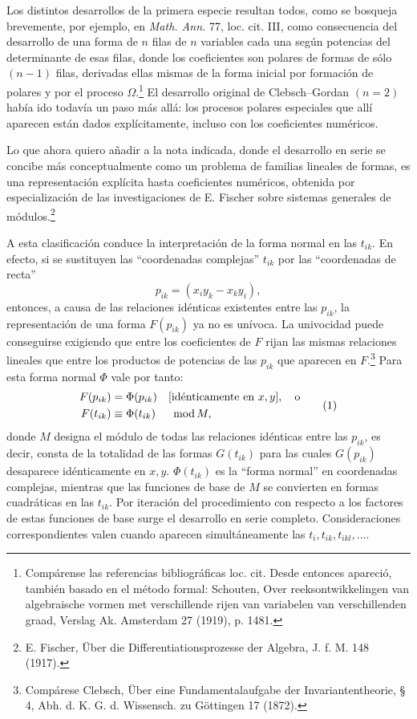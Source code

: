 \documentclass[11pt]{article}
\newcommand{\modu}[1]{\;\operatorname{mod} #1}
\begin{document}
Los distintos desarrollos de la primera especie resultan todos, como se bosqueja brevemente, por ejemplo, en \emph{Math. Ann.} 77, loc. cit. III, como consecuencia del desarrollo de una forma de \(n\) filas de \(n\) variables cada una según potencias del determinante de esas filas, donde los coeficientes son polares de formas de sólo \((n-1)\) filas, derivadas ellas mismas de la forma inicial por formación de polares y por el proceso \(\Omega\).\footnote{Compárense las referencias bibliográficas loc. cit. Desde entonces apareció, también basado en el método formal: Schouten, Over reeksontwikkelingen van algebraische vormen met verschillende rijen van variabelen van verschillenden graad, Verslag Ak. Amsterdam 27 (1919), p. 1481.} El desarrollo original de Clebsch--Gordan \((n=2)\) había ido todavía un paso más allá: los procesos polares especiales que allí aparecen están dados explícitamente, incluso con los coeficientes numéricos.

Lo que ahora quiero añadir a la nota indicada, donde el desarrollo en serie se concibe más conceptualmente como un problema de familias lineales de formas, es una representación explícita hasta coeficientes numéricos, obtenida por especialización de las investigaciones de E. Fischer sobre sistemas generales de módulos.\footnote{E. Fischer, Über die Differentiationsprozesse der Algebra, J. f. M. 148 (1917).}

A esta clasificación conduce la interpretación de la forma normal en las \(t_{ik}\). En efecto, si se sustituyen las ``coordenadas complejas'' \(t_{ik}\) por las ``coordenadas de recta''
\[
        p_{ik}=(x_i y_k-x_k y_i),
\]
entonces, a causa de las relaciones idénticas existentes entre las \(p_{ik}\), la representación de una forma \(F(p_{ik})\) ya no es unívoca. La univocidad puede conseguirse exigiendo que entre los coeficientes de \(F\) rijan las mismas relaciones lineales que entre los productos de potencias de las \(p_{ik}\) que aparecen en \(F\).\footnote{Compárese Clebsch, Über eine Fundamentalaufgabe der Invariantentheorie, § 4, Abh. d. K. G. d. Wissensch. zu Göttingen 17 (1872).} Para esta forma normal \(\Phi\) vale por tanto:
\begin{equation}
\begin{aligned}
        F(p_{ik})&=\Phi(p_{ik}) &&[\text{idénticamente en }x,y],\quad\text{o}\notag\\
        F(t_{ik})&\equiv\Phi(t_{ik}) &&\modu{M},
\end{aligned}
\tag{1}
\end{equation}
donde \(M\) designa el módulo de todas las relaciones idénticas entre las \(p_{ik}\), es decir, consta de la totalidad de las formas \(G(t_{ik})\) para las cuales \(G(p_{ik})\) desaparece idénticamente en \(x,y\). \(\Phi(t_{ik})\) es la ``forma normal'' en coordenadas complejas, mientras que las funciones de base de \(M\) se convierten en formas cuadráticas en las \(t_{ik}\). Por iteración del procedimiento con respecto a los factores de estas funciones de base surge el desarrollo en serie completo. Consideraciones correspondientes valen cuando aparecen simultáneamente las \(t_i,t_{ik},t_{ikl},\ldots\).
\end{document}
